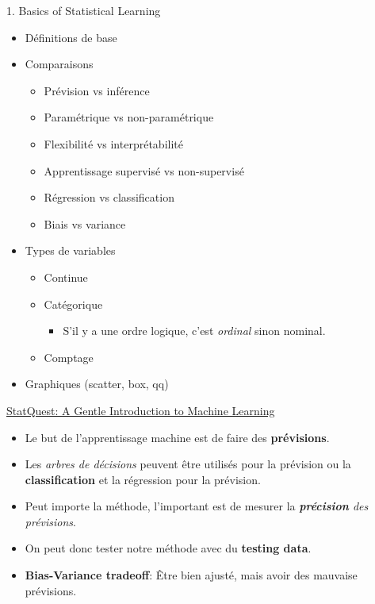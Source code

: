 \documentclass[12pt, titlepage, french]{report}
\begin{document}
\begin{CHPT_SUMM}{1. Basics of Statistical Learning}
	\begin{itemize}
		\item	Définitions de base
		\item	Comparaisons
		\begin{itemize}
			\item	Prévision vs inférence
			\item	Paramétrique vs non-paramétrique 
			\item	Flexibilité vs interprétabilité
			\item	Apprentissage supervisé vs non-supervisé
			\item	Régression vs classification
			\item	Biais vs variance 
		\end{itemize}
		\item	Types de variables
		\begin{itemize}
			\item	Continue
			\item	Catégorique
			\begin{itemize}
				\item[]	S'il y a une ordre logique, c'est \textit{ordinal} sinon nominal.
			\end{itemize}
			\item	Comptage
		\end{itemize}
		\item	Graphiques (scatter, box, qq)
	\end{itemize}
\end{CHPT_SUMM}


\begin{YTB_SUMM}{\href{https://www.youtube.com/watch?v=Gv9_4yMHFhI&list=PLblh5JKOoLUICTaGLRoHQDuF_7q2GfuJF&index=2&t=0s}{StatQuest: A Gentle Introduction to Machine Learning}}
\begin{itemize}
	\item	Le but de l'apprentissage machine est de faire des \textbf{prévisions}. 
	\item	Les \textit{arbres de décisions} peuvent être utilisés pour la prévision ou la \textbf{classification} et la régression pour la prévision.
	\item	Peut importe la méthode, l'important est de mesurer la \textit{\textbf{précision} des prévisions}.
	\item	On peut donc tester notre méthode avec du \textbf{testing data}.
	\item	\textbf{Bias-Variance tradeoff}: Être bien ajusté, mais avoir des mauvaise prévisions.
\end{itemize}
\end{YTB_SUMM}
\end{document}
